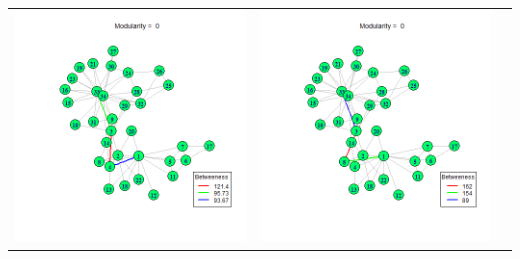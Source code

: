 \documentclass[letterpaper,11pt]{report}
\begin{document}
\begin{savenotes}
\begin{table}[htbp]
\begin{tabular}{ccc}
			\includegraphics[scale=0.25]{karateClub-community-0007.png} &
			\includegraphics[scale=0.25]{karateClub-community-0008.png} & 

\end{tabular}
\end{table}
\end{savenotes}
\end{document}
